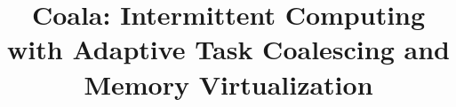 \documentclass[sigplan,10pt,review,anonymous]{acmart}
\newcommand{\sys}{Coala\xspace}
\newcommand{\sysmed}{\sys: Intermittent Computing $\ldots$}
\newcommand{\sysfull}{\sys: Intermittent Computing with Adaptive Task Coalescing and Memory Virtualization}
\begin{document}
\title[\sysmed]{\sysfull}









\begin{abstract}
	


\end{abstract}

\end{document}
